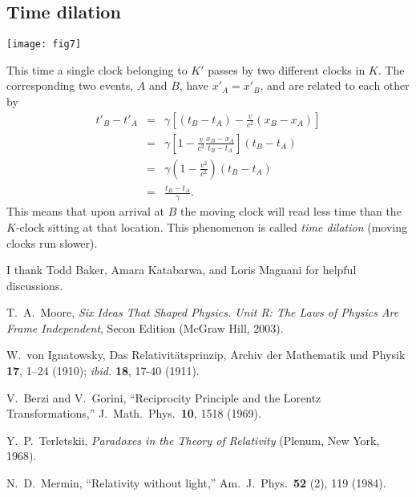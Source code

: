 \documentclass[twocolumn,preprintnumbers,amsmath,amssymb,final]{revtex4}
\def\BEqA{\begin{eqnarray}}
\def\EEqA{\end{eqnarray}}
\begin{document}
\subsection{Time dilation}




\texttt{[image: fig7]}



This time a single clock belonging to $K'$ 
passes by two different clocks in $K$. 
The corresponding two events, 
$A$ and $B$, have
$x'_{A}=x'_{B}$, and are related to each other by
\BEqA
t'_{B}-t'_{A}&=&
\gamma
\left[
\left(t_{B}-t_{A}\right)-\frac{v}{c^2}\left(x_{B}-x_{A}\right)
\right]
\nonumber \\
&=& 
\gamma
\left[
1-\frac{v}{c^2}\frac{x_{B}-x_{A}}{t_{B}-t_{A}}
\right]\left(t_{B}-t_{A}\right)
\nonumber \\
&=& 
\gamma
\left(
1-\frac{v^2}{c^2}\right)\left(t_{B}-t_{A}\right)
\nonumber \\
&=& 
\frac{t_{B}-t_{A}}{\gamma}.
\EEqA
This means that upon arrival at $B$ the moving clock will read less time than
the $K$-clock sitting at that location. This phenomenon is called {\it time dilation} (moving clocks 
run slower).

\begin{acknowledgments}

I thank Todd Baker, Amara Katabarwa, and Loris Magnani for helpful discussions.

\end{acknowledgments}


\begin{thebibliography}{}

T.\ A.\ Moore, {\it Six Ideas That Shaped Physics. Unit R: The Laws of Physics 
Are Frame Independent}, Secon Edition (McGraw Hill, 2003).

W.\ von Ignatowsky, Das Relativit\"{a}tsprinzip, Archiv der
Mathematik und Physik {\bf 17}, 1–24 (1910); {\it ibid.} {\bf 18}, 17-40 (1911).

V.\ Berzi and V.\ Gorini, 
``Reciprocity Principle and the Lorentz Transformations,'' 
J.\ Math.\ Phys.\ {\bf 10}, 1518 (1969).

Y.\ P.\ Terletskii, {\it Paradoxes in the Theory of Relativity} (Plenum, New York, 1968).

N.\ D.\ Mermin, 
``Relativity without light,'' 
Am.\ J.\ Phys.\ {\bf 52} (2), 119 (1984).

\end{thebibliography}
\end{document}
